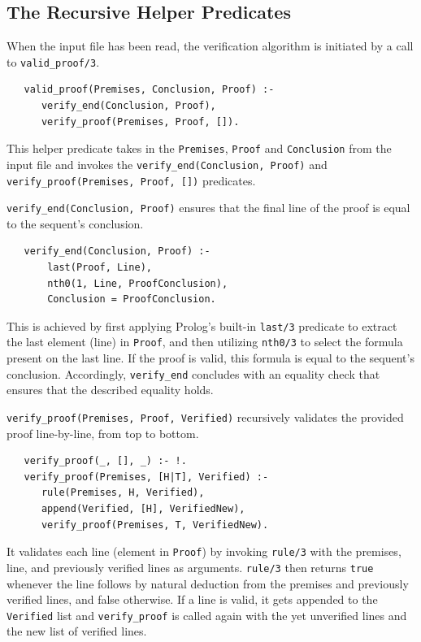 \documentclass[a4paper, 11pt]{article}
\begin{document}
   \subsection{The Recursive Helper Predicates}
   \label{recursive-helper-predicates}

   When the input file has been read, the verification
   algorithm is initiated by a call to
   \texttt{valid\_proof/3}. 
   
\begin{verbatim}
   valid_proof(Premises, Conclusion, Proof) :- 
      verify_end(Conclusion, Proof),
      verify_proof(Premises, Proof, []).
\end{verbatim}

   This helper predicate takes in the
   \texttt{Premises}, \texttt{Proof} and \texttt{Conclusion}
   from the input file and invokes the 
   \texttt{verify\_end(Conclusion, Proof)} and \\
   \texttt{verify\_proof(Premises, Proof, [])} predicates.
   \bigbreak

   \texttt{verify\_end(Conclusion, Proof)} ensures 
   that the final line of the proof is equal to the
   sequent's conclusion. 
   
\begin{verbatim}
   verify_end(Conclusion, Proof) :-
       last(Proof, Line),              
       nth0(1, Line, ProofConclusion),
       Conclusion = ProofConclusion.
\end{verbatim}
   
   This is achieved by
   first applying Prolog's built-in \texttt{last/3}
   predicate to extract the last element (line) in
   \texttt{Proof}, and then utilizing \texttt{nth0/3} 
   to select the formula present on the last line. If
   the proof is valid, this formula is equal to
   the sequent's conclusion. Accordingly, 
   \texttt{verify\_end} concludes with an equality
   check that ensures that the described equality
   holds.
   \bigbreak

   \texttt{verify\_proof(Premises, Proof, Verified)}
   recursively validates the provided proof
   line-by-line, from top to bottom. 
   
\begin{verbatim}
   verify_proof(_, [], _) :- !.
   verify_proof(Premises, [H|T], Verified) :-
      rule(Premises, H, Verified),
      append(Verified, [H], VerifiedNew),
      verify_proof(Premises, T, VerifiedNew).
\end{verbatim}

   It validates each 
   line (element in \texttt{Proof}) by invoking 
   \texttt{rule/3} with the premises, line, and 
   previously verified lines as arguments. 
   \texttt{rule/3} then returns \texttt{true} whenever 
   the line follows by natural deduction from the 
   premises and previously verified lines, and false
   otherwise. If a line is valid, it gets appended to
   the \texttt{Verified} list and \texttt{verify\_proof}
   is called again with the yet unverified lines and
   the new list of verified lines.
\end{document}
